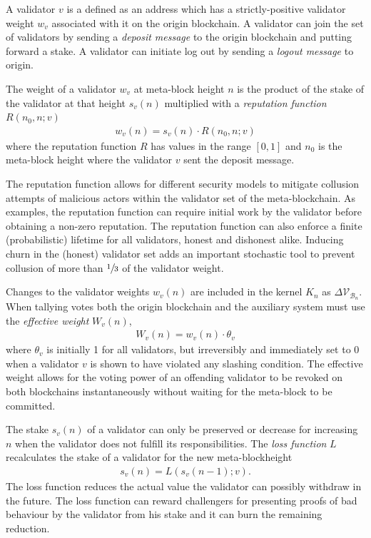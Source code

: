 \documentclass[12pt,a4paper]{article}
\begin{document}
A validator $v$ is a defined as an address which has a strictly-positive validator weight $w_v$ associated with it on the origin blockchain.
A validator can join the set of validators by sending a \emph{deposit message} to the origin blockchain and putting forward a stake.
A validator can initiate log out by sending a \emph{logout message} to origin.

The weight of a validator $w_v$ at meta-block height $n$ is the product of the stake of the validator at that height $s_v(n)$ multiplied with a \emph{reputation function} $R(n_0, n; v)$
\begin{align}
  w_v(n) = s_v(n) \cdot R(n_0, n; v)
\end{align}
where the reputation function $R$ has values in the range $[0,1]$ and $n_0$ is the meta-block height where the validator $v$ sent the deposit message.

The reputation function allows for different security models to mitigate collusion attempts of malicious actors within the validator set of the meta-blockchain.
As examples, the reputation function can require initial work by the validator before obtaining a non-zero reputation.
The reputation function can also enforce a finite (probabilistic) lifetime for all validators, honest and dishonest alike.
Inducing churn in the (honest) validator set adds an important stochastic tool to prevent collusion of more than $\sfrac{1}{3}$ of the validator weight.

Changes to the validator weights $w_v(n)$ are included in the kernel $K_n$ as $\Delta\mathcal{V}_{\mathcal{B}_n}$.  When tallying votes both the origin blockchain and the auxiliary system must use the \emph{effective weight} $W_v(n)$,
\begin{align*}
  W_v(n) = w_v(n) \cdot \theta_v
\end{align*}
where $\theta_v$ is initially 1 for all validators, but irreversibly and immediately set to 0 when a validator $v$ is shown to have violated any slashing condition.
The effective weight allows for the voting power of an offending validator to be revoked on both blockchains instantaneously without waiting for the meta-block to be committed.

The stake $s_v(n)$ of a validator can only be preserved or decrease for increasing $n$ when the validator does not fulfill its responsibilities.
The \emph{loss function} $L$ recalculates the stake of a validator for the new meta-blockheight
\begin{align}
  s_v(n) = L(s_v(n-1); v).
\end{align}
The loss function reduces the actual value the validator can possibly withdraw in the future.  The loss function can reward challengers for presenting proofs of bad behaviour by the validator from his stake and it can burn the remaining reduction.
\end{document}
